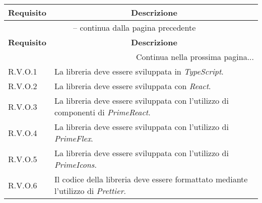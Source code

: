 \begin{center}
    \begin{longtable}{|p{2.5cm}|p{10cm}|}
        \hline
        \rowcolor{gray!30}
        \textbf{Requisito} & \multicolumn{1}{c|}{\textbf{Descrizione}}                                                 \\
        \hline
        \endfirsthead
        \hline
        \multicolumn{2}{|c|}{{\tablename\ \thetable{} -- continua dalla pagina precedente}}                            \\
        \hline
        \rowcolor{gray!30}
        \textbf{Requisito} & \multicolumn{1}{c|}{\textbf{Descrizione}}                                                 \\
        \endhead
        \hline
        \multicolumn{2}{|r|}{{Continua nella prossima pagina...}}                                                      \\
        \hline
        \endfoot
        \hline
        \endlastfoot
        \hline
        R.V.O.1            & La libreria deve essere sviluppata in \textit{TypeScript}.                                \\
        \hline
        R.V.O.2            & La libreria deve essere sviluppata con \textit{React}.                                    \\
        \hline
        R.V.O.3            & La libreria deve essere sviluppata con l'utilizzo di componenti di \textit{PrimeReact}.   \\
        \hline
        R.V.O.4            & La libreria deve essere sviluppata con l'utilizzo di \textit{PrimeFlex}.                  \\
        \hline
        R.V.O.5            & La libreria deve essere sviluppata con l'utilizzo di \textit{PrimeIcons}.                 \\
        \hline
        R.V.O.6            & Il codice della libreria deve essere formattato mediante l'utilizzo di \textit{Prettier}. \\
    \end{longtable}
    \label{tab:requisiti_vincolo}
\end{center}
